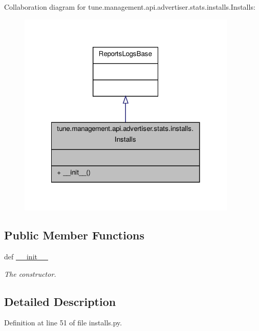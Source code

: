 Collaboration diagram for tune.\-management.\-api.\-advertiser.\-stats.\-installs.\-Installs\-:
\nopagebreak
\begin{figure}[H]
\begin{center}
\leavevmode
\includegraphics[width=296pt]{classtune_1_1management_1_1api_1_1advertiser_1_1stats_1_1installs_1_1Installs__coll__graph}
\end{center}
\end{figure}
\subsection*{Public Member Functions}
\begin{DoxyCompactItemize}
\item 
def \hyperlink{classtune_1_1management_1_1api_1_1advertiser_1_1stats_1_1installs_1_1Installs_a7d50d6bd87ad812e00353417a8fc2ea0}{\-\_\-\-\_\-init\-\_\-\-\_\-}
\begin{DoxyCompactList}\small\item\em The constructor. \end{DoxyCompactList}\end{DoxyCompactItemize}


\subsection{Detailed Description}


Definition at line 51 of file installs.\-py.



